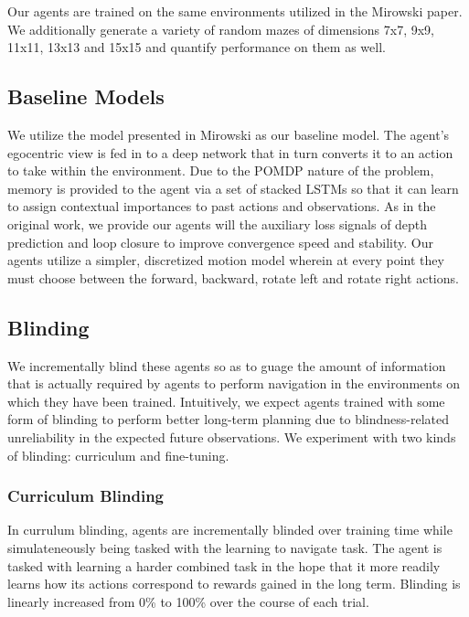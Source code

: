 
Our agents are trained on the same environments utilized in the Mirowski \etal paper. We additionally generate a variety of random mazes of dimensions 7x7, 9x9, 11x11, 13x13 and 15x15 and quantify performance on them as well.

\subsection{Baseline Models}
We utilize the model presented in Mirowski \etal as our baseline model. The agent's egocentric view is fed in to a deep network that in turn converts it to an action to take within the environment. Due to the POMDP nature of the problem, memory is provided to the agent via a set of stacked LSTMs so that it can learn to assign contextual importances to past actions and observations. As in the original work, we provide our agents will the auxiliary loss signals of depth prediction and loop closure to improve convergence speed and stability. Our agents utilize a simpler, discretized motion model wherein at every point they must choose between the forward, backward, rotate left and rotate right actions.

\subsection{Blinding}
We incrementally blind these agents so as to guage the amount of information that is actually required by agents to perform navigation in the environments on which they have been trained. Intuitively, we expect agents trained with some form of blinding to perform better long-term planning due to blindness-related unreliability in the expected future observations. We experiment with two kinds of blinding: curriculum and fine-tuning. 

\subsubsection{Curriculum Blinding}
In currulum blinding, agents are incrementally blinded over training time while simulateneously being tasked with the learning to navigate task. The agent is tasked with learning a harder combined task in the hope that it more readily learns how its actions correspond to rewards gained in the long term. Blinding is linearly increased from 0\% to 100\% over the course of each trial. 

